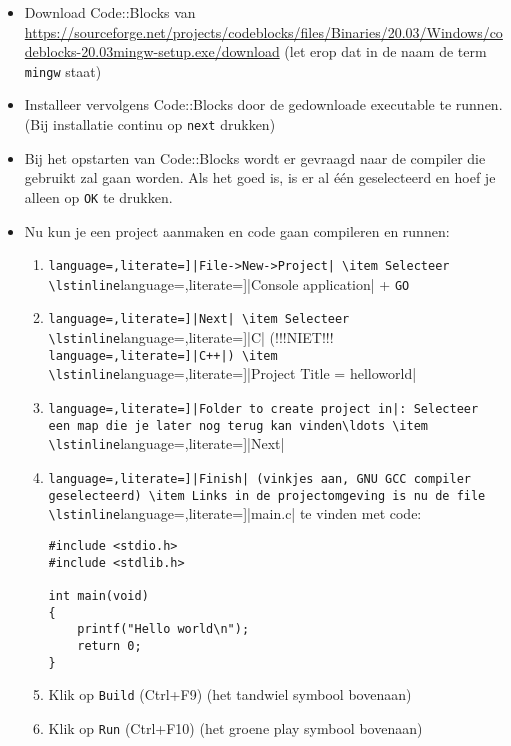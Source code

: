 \documentclass[a4paper,10pt,fleqn,twoside]{article}
\begin{document}
\begin{itemize}
\item Download Code::Blocks van \url{https://sourceforge.net/projects/codeblocks/files/Binaries/20.03/Windows/codeblocks-20.03mingw-setup.exe/download} (let erop dat in de naam de term \texttt{mingw} staat)
\item Installeer vervolgens Code::Blocks door de gedownloade executable te runnen. (Bij installatie continu op \texttt{next} drukken)
\item Bij het opstarten van Code::Blocks wordt er gevraagd naar de compiler die gebruikt zal gaan worden. Als het goed is, is er al \'e\'en geselecteerd en hoef je alleen op \texttt{OK} te drukken.
\item Nu kun je een project aanmaken en code gaan compileren en runnen:
\begin{enumerate}[label=\alph*.]
\item \lstinline[language=,literate=]|File->New->Project|
\item Selecteer \lstinline[language=,literate=]|Console application| + \lstinline|GO|
\item \lstinline[language=,literate=]|Next|
\item Selecteer \lstinline[language=,literate=]|C| (!!!NIET!!! \lstinline[language=,literate=]|C++|)
\item \lstinline[language=,literate=]|Project Title = helloworld|
\item \lstinline[language=,literate=]|Folder to create project in|: Selecteer een map die je later nog terug kan vinden\ldots
\item \lstinline[language=,literate=]|Next|
\item \lstinline[language=,literate=]|Finish| (vinkjes aan, GNU GCC compiler geselecteerd)
\item Links in de projectomgeving is nu de file \lstinline[language=,literate=]|main.c| te vinden met code:

\begin{lstlisting}
#include <stdio.h>
#include <stdlib.h>

int main(void)
{
    printf("Hello world\n");
    return 0;
}
\end{lstlisting}
\item Klik op \lstinline|Build| (Ctrl+F9) (het tandwiel symbool bovenaan)
\item Klik op \lstinline|Run| (Ctrl+F10) (het groene play symbool bovenaan)
\end{enumerate}
\end{itemize}
\end{document}
